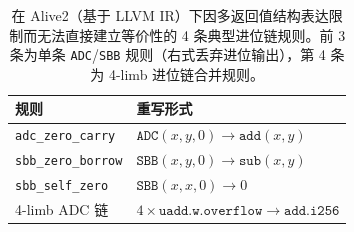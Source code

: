 \begin{table}[t]
\centering
\caption{在 Alive2（基于 LLVM IR）下因多返回值结构表达限制而无法直接建立等价性的 4 条典型进位链规则。前 3 条为单条 \texttt{ADC}/\texttt{SBB} 规则（右式丢弃进位输出），第 4 条为 4-limb 进位链合并规则。}
\label{tab:cannot-express}
\footnotesize
\begin{tabular}{@{}ll@{}}
\toprule
规则 & 重写形式 \\
\midrule
\texttt{adc\_zero\_carry}  & $\texttt{ADC}(x,y,0) \to \texttt{add}(x,y)$ \\
\texttt{sbb\_zero\_borrow} & $\texttt{SBB}(x,y,0) \to \texttt{sub}(x,y)$ \\
\texttt{sbb\_self\_zero}   & $\texttt{SBB}(x,x,0) \to 0$ \\
\midrule
4-limb ADC 链 & $4 \times \texttt{uadd.w.overflow} \to \texttt{add.i256}$ \\
\bottomrule
\end{tabular}
\end{table}
